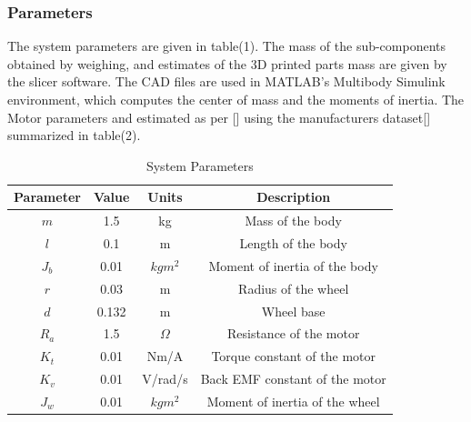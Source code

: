         \subsubsection{Parameters }
        The system parameters are given in table(1). 
        The mass of the sub-components obtained by weighing,
        and estimates of the 3D printed parts mass are given by the slicer software. 
        The CAD files are used in MATLAB's Multibody Simulink environment, which 
        computes the center of mass and the moments of inertia.
        The Motor parameters and estimated as per [] using the manufacturers dataset[] summarized in table(2).
    
        \begin{table} [H]
            \centering
            \begin{tabular}{|c|c|c|c|}
                \hline
                Parameter & Value & Units & Description \\
                \hline
                $m$ & 1.5 & kg & Mass of the body \\
                $l$ & 0.1 & m & Length of the body \\
                $J_b$ & 0.01 & $kgm^2$ & Moment of inertia of the body \\
                $r$ & 0.03 & m & Radius of the wheel \\
                $d$ & 0.132 & m & Wheel base \\
                $R_a$ & 1.5 & $\Omega$ & Resistance of the motor \\
                $K_t$ & 0.01 & Nm/A & Torque constant of the motor \\
                $K_v$ & 0.01 & V/rad/s & Back EMF constant of the motor \\
                $J_w$ & 0.01 & $kgm^2$ & Moment of inertia of the wheel \\
                \hline
            \end{tabular}
            \caption{System Parameters}
        \end{table}

